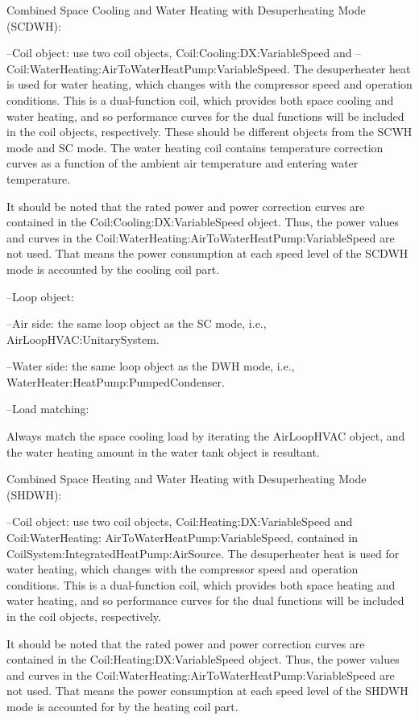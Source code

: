 Combined Space Cooling and Water Heating with Desuperheating Mode (SCDWH):

--Coil object: use two coil objects, Coil:Cooling:DX:VariableSpeed and -- Coil:WaterHeating:AirToWaterHeatPump:VariableSpeed. The desuperheater heat is used for water heating, which changes with the compressor speed and operation conditions. This is a dual-function coil, which provides both space cooling and water heating, and so performance curves for the dual functions will be included in the coil objects, respectively. These should be different objects from the SCWH mode and SC mode. The water heating coil contains temperature correction curves as a function of the ambient air temperature and entering water temperature.

It should be noted that the rated power and power correction curves are contained in the Coil:Cooling:DX:VariableSpeed object. Thus, the power values and curves in the Coil:WaterHeating:AirToWaterHeatPump:VariableSpeed are not used. That means the power consumption at each speed level of the SCDWH mode is accounted by the cooling coil part.

--Loop object:

--Air side: the same loop object as the SC mode, i.e., AirLoopHVAC:UnitarySystem.

--Water side:  the same loop object as the DWH mode, i.e., WaterHeater:HeatPump:PumpedCondenser.

--Load matching:

Always match the space cooling load by iterating the AirLoopHVAC object, and the water heating amount in the water tank object is resultant.

Combined Space Heating and Water Heating with Desuperheating Mode (SHDWH):

--Coil object: use two coil objects, Coil:Heating:DX:VariableSpeed and Coil:WaterHeating: AirToWaterHeatPump:VariableSpeed, contained in CoilSystem:IntegratedHeatPump:AirSource. The desuperheater heat is used for water heating, which changes with the compressor speed and operation conditions. This is a dual-function coil, which provides both space heating and water heating, and so performance curves for the dual functions will be included in the coil objects, respectively.

It should be noted that the rated power and power correction curves are contained in the Coil:Heating:DX:VariableSpeed object. Thus, the power values and curves in the Coil:WaterHeating:AirToWaterHeatPump:VariableSpeed are not used. That means the power consumption at each speed level of the SHDWH mode is accounted for by the heating coil part.


